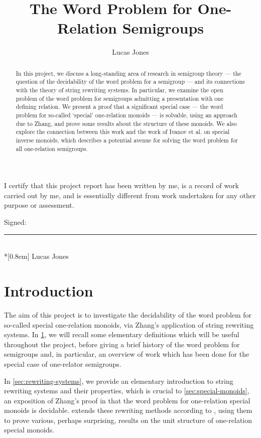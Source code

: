 \documentclass[noindex,noinsetproof,12pt]{lmaths}
\title{The Word Problem for One-Relation Semigroups}
\author{Lucas Jones}
\newcommand{\frontmatter}{\pagenumbering{roman}}
\newcommand{\mainmatter}{\pagenumbering{arabic}}
\begin{document}
\vfill
\maketitle
\vfill
\thispagestyle{empty}
\clearpage

\frontmatter

\clearpage
I certify that this project report has been written by me, is a record of work carried out by me, and is essentially different from work undertaken for any other purpose or assessment.

\vspace{1.5em}
Signed: \rule[-2pt]{15em}{1pt} \\*[0.8em]
\hphantom{Signed: }Lucas Jones
\clearpage


\begin{abstract}
	In this project, we discuss a long-standing area of research in semigroup theory --- the question of the decidability of the word problem for a semigroup --- and its connections with the theory of string rewriting systems. In particular, we examine the open problem of the word problem for semigroups admitting a presentation with one defining relation. We present a proof that a significant special case --- the word problem for so-called `special' one-relation monoids --- is solvable, using an approach due to Zhang, and prove some results about the structure of these monoids. We also explore the connection between this work and the work of Ivanov et al. on special inverse monoids, which describes a potential avenue for solving the word problem for all one-relation semigroups.
\end{abstract}
\clearpage

\tableofcontents

\clearpage

\mainmatter
\section{Introduction} \label{sec:intro}

The aim of this project is to investigate the decidability of the word problem for so-called special one-relation monoids, via Zhang's application of string rewriting systems. In \cref{sec:intro}, we will recall some elementary definitions which will be useful throughout the project, before giving a brief history of the word problem for semigroups and, in particular, an overview of work which has been done for the special case of one-relator semigroups.

In \cref{sec:rewriting-systems}, we provide an elementary introduction to string rewriting systems and their properties, which is crucial to \cref{sec:special-monoids}, an exposition of Zhang's proof in \cite{Zhang1992a} that the word problem for one-relation special monoids is decidable.  extends these rewriting methods according to \cite{Zhang1992}, using them to prove various, perhaps surprising, results on the unit structure of one-relation special monoids.
\end{document}
